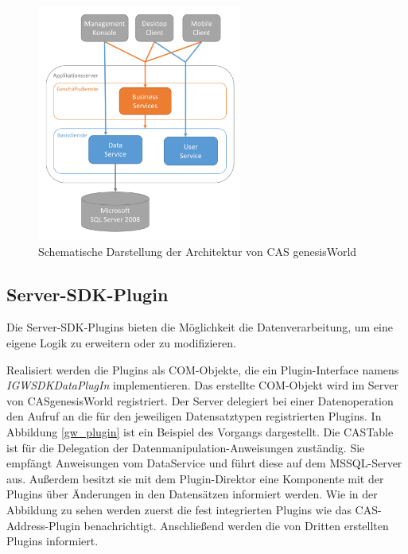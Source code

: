 \begin{figure}[H]
	\centering
  \includegraphics[width=0.6\textwidth, width=0.6\textwidth]{pics/GenesisWorld_Architektur.pdf}
	\caption{Schematische Darstellung der Architektur von CAS genesisWorld}
	\label{gw_Architektur}
\end{figure}

\subsection{Server-SDK-Plugin}
\label{ch:Systemanalyse:sec:genesisWorld:subsec:plugin}

Die Server-SDK-Plugins bieten die Möglichkeit die Datenverarbeitung, um eine eigene Logik zu erweitern oder zu modifizieren. 

Realisiert werden die Plugins als COM-Objekte, die ein Plugin-Interface namens \textit{IGWSDKDataPlugIn} implementieren. Das erstellte COM-Objekt wird im Server von CASgenesisWorld registriert. Der Server delegiert bei einer Datenoperation den Aufruf an die für den jeweiligen Datensatztypen registrierten Plugins. In Abbildung \ref{gw_plugin} ist ein Beispiel des Vorgangs dargestellt. Die CASTable ist für die Delegation der Datenmanipulation-Anweisungen zuständig. Sie empfängt Anweisungen vom DataService und führt diese auf dem MSSQL-Server aus. Außerdem besitzt sie mit dem Plugin-Direktor eine Komponente mit der Plugins über Änderungen in den Datensätzen informiert werden. Wie in der Abbildung zu sehen werden zuerst die fest integrierten Plugins wie das CAS-Address-Plugin benachrichtigt. Anschließend werden die von Dritten erstellten Plugins informiert.

